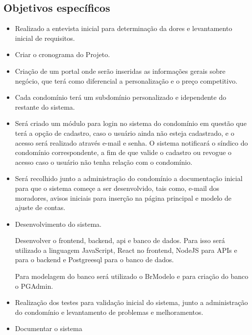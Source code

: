 \subsection{Objetivos específicos}
\begin{itemize}
    \item Realizado a entevista inicial para determinação da dores e levantamento
    inicial de requisitos.
    
    \item Criar o cronograma do Projeto.
    
    \item Criação de um portal onde serão inseridas as informações gerais sobre
negócio, que terá como diferencial a personalização e o preço competitivo.
    
    \item Cada condomínio terá um subdomínio personalizado e idependente do
restante do sistema.

    \item Será criado um módulo para login no sistema do condomínio em questão
que terá a opção de cadastro, caso o usuário ainda não esteja cadastrado,
e o acesso será realizado através e-mail e senha. O sistema notificará o síndico
do condomínio correspondente, a fim de que valide o cadastro ou revogue o acesso
caso o usuário não tenha relação com o condomínio.

    \item Será recolhido junto a administração do condomínio a documentação 
inicial para que o sistema começe a ser desenvolvido, tais como, e-mail
dos moradores, avisos iniciais para inserção na página principal e modelo de
ajuste de contas.

    \item Desenvolvimento do sistema.
    
    Desenvolver o frontend, backend, api e banco de dados. Para isso será 
utilizado a linguagem JavaScript, React no frontend, NodeJS para APIs e para
o backend e Postgreesql para o banco de dados.

    Para modelagem do banco será utilizado o BrModelo e para criação do banco o PGAdmin.

    \item Realização dos testes para validação inicial do sistema, junto a administração
do condomínio e levantamento de problemas e melhoramentos.

    \item Documentar o sistema
    
\end{itemize}





